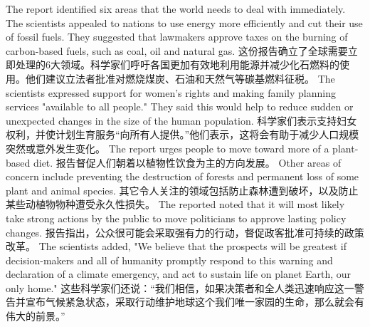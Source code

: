 The report identified six areas that the world needs to deal with immediately. The scientists appealed to nations to use energy more efficiently and cut their use of fossil fuels. They suggested that lawmakers approve taxes on the burning of carbon-based fuels, such as coal, oil and natural gas.
这份报告确立了全球需要立即处理的6大领域。科学家们呼吁各国更加有效地利用能源并减少化石燃料的使用。他们建议立法者批准对燃烧煤炭、石油和天然气等碳基燃料征税。
The scientists expressed support for women's rights and making family planning services "available to all people." They said this would help to reduce sudden or unexpected changes in the size of the human population.
科学家们表示支持妇女权利，并使计划生育服务“向所有人提供。”他们表示，这将会有助于减少人口规模突然或意外发生变化。
The report urges people to move toward more of a plant-based diet.
报告督促人们朝着以植物性饮食为主的方向发展。
Other areas of concern include preventing the destruction of forests and permanent loss of some plant and animal species.
其它令人关注的领域包括防止森林遭到破坏，以及防止某些动植物物种遭受永久性损失。
The reported noted that it will most likely take strong actions by the public to move politicians to approve lasting policy changes.
报告指出，公众很可能会采取强有力的行动，督促政客批准可持续的政策改革。
The scientists added, "We believe that the prospects will be greatest if decision-makers and all of humanity promptly respond to this warning and declaration of a climate emergency, and act to sustain life on planet Earth, our only home."
这些科学家们还说：“我们相信，如果决策者和全人类迅速响应这一警告并宣布气候紧急状态，采取行动维护地球这个我们唯一家园的生命，那么就会有伟大的前景。”
